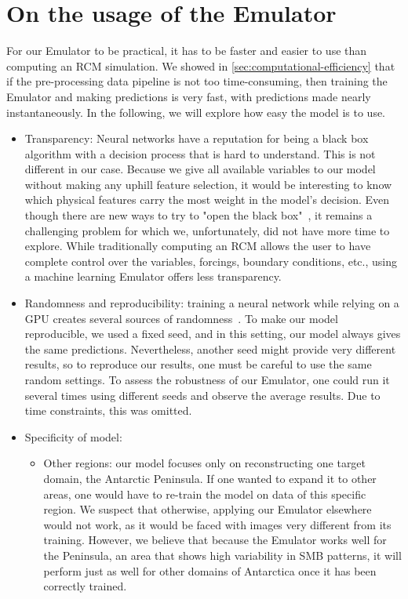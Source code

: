 \documentclass[a4paper,11pt,oneside]{report}
\begin{document}
\section{On the usage of the Emulator}\label{sec:utility-emulators}
For our Emulator to be practical, it has to be faster and easier to use than computing an RCM simulation. We showed in \autoref{sec:computational-efficiency} that if the pre-processing data pipeline is not too time-consuming, then training the Emulator and making predictions is very fast, with predictions made nearly instantaneously. In the following, we will explore how easy the model is to use.  
\begin{itemize}
    \item Transparency: Neural networks have a reputation for being a black box algorithm with a decision process that is hard to understand. This is not different in our case. Because we give all available variables to our model without making any uphill feature selection, it would be interesting to know which physical features carry the most weight in the model's decision. Even though there are new ways to try to "open the black box"~\cite{Guidotti, Doury}, it remains a challenging problem for which we, unfortunately, did not have more time to explore. While traditionally computing an RCM allows the user to have complete control over the variables, forcings, boundary conditions, etc., using a machine learning Emulator offers less transparency.  
    \item Randomness and reproducibility: training a neural network while relying on a GPU creates several sources of randomness~\cite{Doury,Zhuang2021}. To make our model reproducible, we used a fixed seed, and in this setting, our model always gives the same predictions. Nevertheless, another seed might provide very different results, so to reproduce our results, one must be careful to use the same random settings. To assess the robustness of our Emulator, one could run it several times using different seeds and observe the average results. Due to time constraints, this was omitted. 
    \item Specificity of model: 
    \begin{itemize}
        \item Other regions: our model focuses only on reconstructing one target domain, the Antarctic Peninsula. If one wanted to expand it to other areas, one would have to re-train the model on data of this specific region. We suspect that otherwise, applying our Emulator elsewhere would not work, as it would be faced with images very different from its training. However, we believe that because the Emulator works well for the Peninsula, an area that shows high variability in SMB patterns, it will perform just as well for other domains of Antarctica once it has been correctly trained. 

\end{itemize}
\end{itemize}
\end{document}

